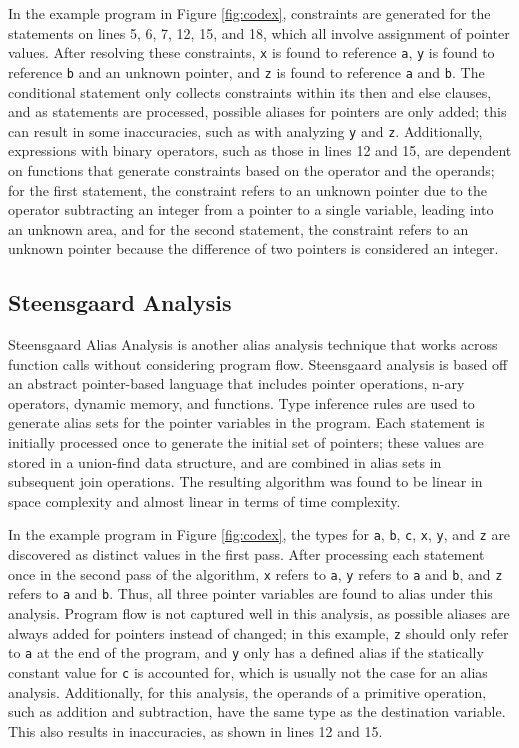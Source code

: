 In the example program in Figure \ref{fig:codex}, constraints are generated for the statements on lines 5, 6, 7, 12, 15, and 18, which all involve assignment of pointer values. After resolving these constraints, \texttt{x} is found to reference \texttt{a}, \texttt{y} is found to reference \texttt{b} and an unknown pointer, and \texttt{z} is found to reference \texttt{a} and \texttt{b}. The conditional statement only collects constraints within its then and else clauses, and as statements are processed, possible aliases for pointers are only added; this can result in some inaccuracies, such as with analyzing \texttt{y} and \texttt{z}. Additionally, expressions with binary operators, such as those in lines 12 and 15, are dependent on functions that generate constraints based on the operator and the operands; for the first statement, the constraint refers to an unknown pointer due to the operator subtracting an integer from a pointer to a single variable, leading into an unknown area, and for the second statement, the constraint refers to an unknown pointer because the difference of two pointers is considered an integer.

\subsection{Steensgaard Analysis}
Steensgaard Alias Analysis \cite{Steensgaard} is another alias analysis technique that works across function calls without considering program flow. Steensgaard analysis is based off an abstract pointer-based language that includes pointer operations, n-ary operators, dynamic memory, and functions. Type inference rules are used to generate alias sets for the pointer variables in the program. Each statement is initially processed once to generate the initial set of pointers; these values are stored in a union-find data structure, and are combined in alias sets in subsequent join operations. The resulting algorithm was found to be linear in space complexity and almost linear in terms of time complexity.

In the example program in Figure \ref{fig:codex}, the types for \texttt{a}, \texttt{b}, \texttt{c}, \texttt{x}, \texttt{y}, and \texttt{z} are discovered as distinct values in the first pass. After processing each statement once in the second pass of the algorithm, \texttt{x} refers to \texttt{a}, \texttt{y} refers to \texttt{a} and \texttt{b}, and \texttt{z} refers to \texttt{a} and \texttt{b}. Thus, all three pointer variables are found to alias under this analysis. Program flow is not captured well in this analysis, as possible aliases are always added for pointers instead of changed; in this example, \texttt{z} should only refer to \texttt{a} at the end of the program, and \texttt{y} only has a defined alias if the statically constant value for \texttt{c} is accounted for, which is usually not the case for an alias analysis. Additionally, for this analysis, the operands of a primitive operation, such as addition and subtraction, have the same type as the destination variable. This also results in inaccuracies, as shown in lines 12 and 15.

